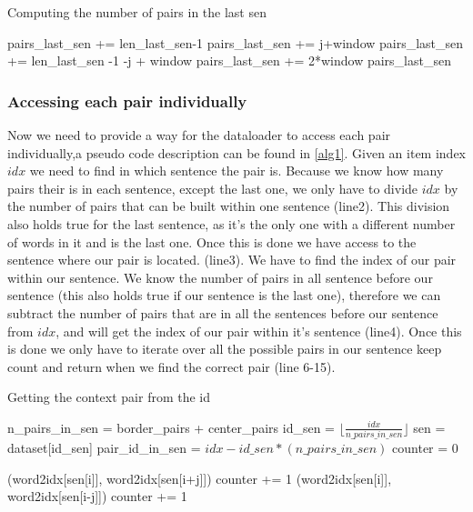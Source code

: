 \begin{algorithm}[h]
\caption{Computing the number of pairs in the last sen}
\label{alg2}
\begin{algorithmic}[1]
\STATE pairs\_last\_sen += len\_last\_sen-1
\ELSE
\STATE pairs\_last\_sen += j+window
\ENDIF
{}
\STATE pairs\_last\_sen += len\_last\_sen -1 -j + window
\ELSE
\STATE pairs\_last\_sen += 2*window
\ENDIF
\ENDFOR
\RETURN pairs\_last\_sen
\end{algorithmic}
\end{algorithm}

 \subsubsection{Accessing each pair individually}
Now we need to provide a way for the dataloader to access each pair individually,a pseudo code description can be found in \ref{alg1}. 
Given an item index $idx$ we need to find in which sentence the pair is. Because we know  how many pairs their is in each sentence, except the last one, we only have to divide $idx$ by the number of pairs that can be built within one sentence (line2). This division also holds true for the last sentence, as it's the only one with a different number of words in it and is the last one.  Once this is done we have access to the sentence where our pair is located. (line3). We have to find the index of our pair within our sentence. We know the number of pairs in all sentence before our sentence (this also holds true if our sentence is the last one), therefore we can subtract the number of pairs that are in all the sentences before our sentence from $idx$, and will get the index of our pair within it's sentence (line4). Once this is done we only have to iterate over all the possible pairs in our sentence keep count and return when we find the correct pair (line 6-15).
\begin{algorithm}
\caption{Getting the context pair from the id}
\label{alg1}
\begin{algorithmic}[1]

\STATE n\_pairs\_in\_sen = border\_pairs + center\_pairs
 \STATE id\_sen = $\lfloor \frac{idx}{n\_pairs\_in\_sen} \rfloor$
\STATE  sen  = dataset[id\_sen]
\STATE  pair\_id\_in\_sen = $idx - id\_sen*(n\_pairs\_in\_sen)$
\STATE counter = 0

\RETURN (word2idx[sen[i]], word2idx[sen[i+j]])
\ENDIF
\STATE counter += 1
\ENDIF
{}
\RETURN (word2idx[sen[i]], word2idx[sen[i-j]])
\ENDIF
\STATE counter += 1
\ENDIF
\ENDFOR
\ENDFOR
\end{algorithmic}
\end{algorithm}

